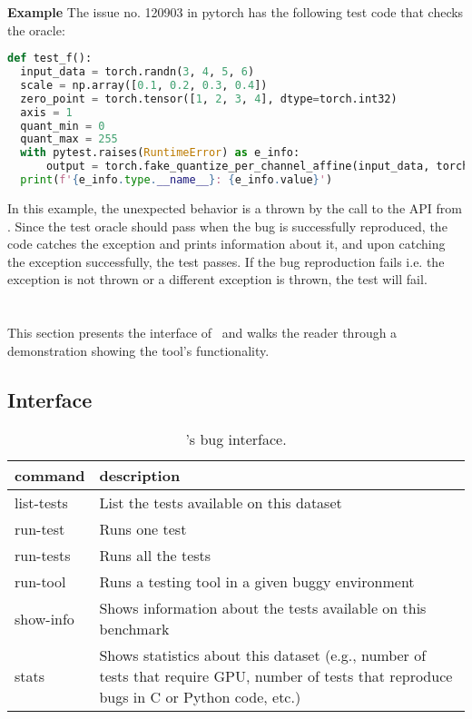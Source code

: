 \documentclass[sigconf,screen]{acmart}
\begin{document}
\textbf{Example}
  The issue no. 120903 in pytorch has the following test code that checks the oracle:

\begin{lstlisting}[language=python,basicstyle=\small,]
def test_f():
  input_data = torch.randn(3, 4, 5, 6)
  scale = np.array([0.1, 0.2, 0.3, 0.4])
  zero_point = torch.tensor([1, 2, 3, 4], dtype=torch.int32)
  axis = 1
  quant_min = 0
  quant_max = 255
  with pytest.raises(RuntimeError) as e_info:
      output = torch.fake_quantize_per_channel_affine(input_data, torch.from_numpy(scale), zero_point, axis, quant_min, quant_max)
  print(f'{e_info.type.__name__}: {e_info.value}')
\end{lstlisting}

In this example, the unexpected behavior is a  thrown by the call to the  API from \torch. Since the test oracle should pass when the bug is successfully reproduced, the code catches the exception and prints information about it, and upon catching the exception successfully, the test passes. If the bug reproduction fails i.e. the exception is not thrown or a different exception is thrown, the test will fail.

\section{\tname} %

This section presents the interface of \tname\ and walks the reader
through a demonstration showing the tool's functionality.


\subsection{Interface}

\begin{table}
  \centering
  \caption{\label{table:bug-interface}\tname's bug interface.}
\begin{tabular}{lp{6.5cm}}
  \toprule
  \textbf{command} & \textbf{description} \\
  \midrule
list-tests & List the tests available on this dataset\\
run-test & Runs one test\\
run-tests & Runs all the tests\\
run-tool & Runs a testing tool in a given buggy environment \\
show-info & Shows information about the tests available on this benchmark\\
stats & Shows statistics about this dataset (e.g., number of tests
that require GPU, number of tests that reproduce bugs in C or Python
code, etc.)\\
\bottomrule
\end{tabular}
\end{table}
\end{document}
